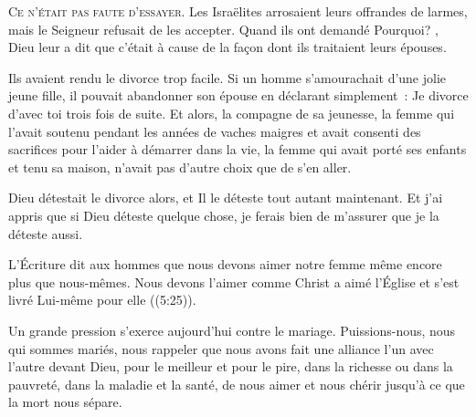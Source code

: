 





\lettrine{C}{e n'était pas faute d'essayer.} Les Israëlites arrosaient
 leurs offrandes de larmes, mais le Seigneur refusait de les accepter.
 Quand ils ont demandé \og Pourquoi? \fg{}, Dieu leur a dit que c'était
 à cause de la façon dont ils traitaient leurs épouses. 

Ils avaient rendu le divorce trop facile. Si un homme s'amourachait
 d'une jolie jeune fille, il pouvait abandonner son épouse en déclarant
 simplement~:  \og Je divorce d'avec toi \fg{}
 trois fois de suite. Et alors, la compagne de sa jeunesse,
 la femme qui l'avait soutenu pendant les années de vaches maigres
 et avait consenti des sacrifices pour l'aider à démarrer dans la vie,
 la femme qui avait porté ses enfants et tenu sa maison,
 n'avait pas d'autre choix que de s'en aller. 


Dieu détestait le divorce alors, et Il le déteste tout autant maintenant.
 Et j'ai appris que si Dieu déteste quelque chose,
 je ferais bien de m'assurer que je la déteste aussi. 

L'Écriture dit aux hommes que nous devons aimer notre femme même encore plus
 que nous-mêmes. Nous devons l'aimer comme \og Christ a aimé l'Église
 et s'est livré Lui-même pour elle \fg{} ((5:25)). 

Un grande pression s'exerce aujourd'hui contre le mariage.
 Puissions-nous, nous qui sommes mariés, nous rappeler que nous avons fait
 une alliance l'un avec l'autre devant Dieu, \og pour le meilleur
 et pour le pire, dans la richesse ou dans la pauvreté, dans la maladie
 et la santé, de nous aimer et nous chérir
 jusqu'à ce que la mort nous sépare. \fg{}

\dvrule



